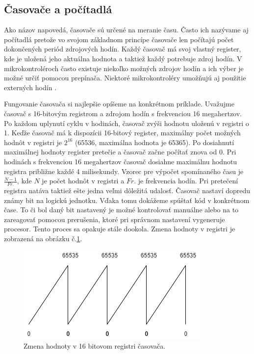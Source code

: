 \subsection{Časovače a počítadlá}
\noindent

Ako názov napovedá, časovače sú určené na meranie času. Často ich nazývame aj počítadlá
pretože vo svojom základnom princípe časovače len počítajú počet dokončených periód zdrojových hodín.
Každý časovač má svoj vlastný register, kde je uložená jeho aktuálna hodnota a taktiež každý potrebuje zdroj hodín. V mikrokontroléroch často existuje niekoľko možných zdrojov
hodín a ich výber je možné určiť pomocou prepínača. Niektoré mikrokontroléry umožňujú aj použitie
externých hodín \cite{IntroductionMicrocontrollerTimers}. \par
Fungovanie časovača si najlepšie opíšeme na konkrétnom príklade.
Uvažujme časovač s 16-bitovým registrom a zdrojom hodín s frekvenciou 16 megahertzov. Po každom uplynutí cyklu v hodinách, časovač
zvýši hodnotu uloženú v registri o 1. Keďže časovač má k dispozícii 16-bitový register, maximálny počet možných hodnôt v registri je $2^{16}$ (65536, maximálna hodnota je 65365).
Po dosiahnutí maximálnej hodnoty register pretečie a časovač začne počítať znova od 0. Pri hodinách s frekvenciou 16 megahertzov časovač dosiahne maximálnu hodnotu registra približne každé 4 milisekundy. Vzorec pre výpočet spomínaného času je
$\frac{N-1}{Fr.}$, kde $N$ je počet hodnôt v registri a $Fr.$ je frekvencia hodín.
Pri pretečení registra natáva taktiež ešte jedna veľmi dôležitá udalosť. Časovač nastaví dopredu známy bit na logickú jednotku. Vďaka tomu dokážeme spúštať
kód v konkrétnom čase. To či bol daný bit nastavený je možné kontrolovať manuálne alebo na to zareagovať pomocou prerušenia, ktoré pri správnom nastavení vygeneruje procesor.
Tento proces sa opakuje stále dookola. Zmena hodnoty v
registri je zobrazená na obrázku č.\ref{figure:timer1}.

\begin{figure}[!h]
    \centering
    \includegraphics{img/timer.png}
    \caption{Zmena hodnoty v 16 bitovom registri časovača.}
    \label{figure:timer1}
\end{figure}

